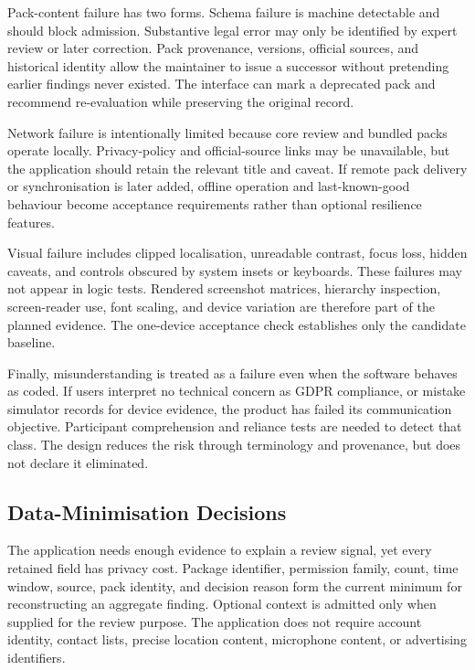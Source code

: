 Pack-content failure has two forms. Schema failure is machine detectable and should block admission. Substantive legal error may only be identified by expert review or later correction. Pack provenance, versions, official sources, and historical identity allow the maintainer to issue a successor without pretending earlier findings never existed. The interface can mark a deprecated pack and recommend re-evaluation while preserving the original record.

Network failure is intentionally limited because core review and bundled packs operate locally. Privacy-policy and official-source links may be unavailable, but the application should retain the relevant title and caveat. If remote pack delivery or synchronisation is later added, offline operation and last-known-good behaviour become acceptance requirements rather than optional resilience features.

Visual failure includes clipped localisation, unreadable contrast, focus loss, hidden caveats, and controls obscured by system insets or keyboards. These failures may not appear in logic tests. Rendered screenshot matrices, hierarchy inspection, screen-reader use, font scaling, and device variation are therefore part of the planned evidence. The one-device acceptance check establishes only the candidate baseline.

Finally, misunderstanding is treated as a failure even when the software behaves as coded. If users interpret no technical concern as GDPR compliance, or mistake simulator records for device evidence, the product has failed its communication objective. Participant comprehension and reliance tests are needed to detect that class. The design reduces the risk through terminology and provenance, but does not declare it eliminated.

\subsection{Data-Minimisation Decisions}

The application needs enough evidence to explain a review signal, yet every retained field has privacy cost. Package identifier, permission family, count, time window, source, pack identity, and decision reason form the current minimum for reconstructing an aggregate finding. Optional context is admitted only when supplied for the review purpose. The application does not require account identity, contact lists, precise location content, microphone content, or advertising identifiers.

